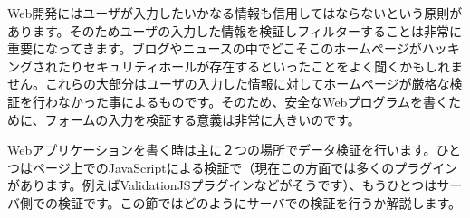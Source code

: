 Web開発にはユーザが入力したいかなる情報も信用してはならないという原則があります。そのためユーザの入力した情報を検証しフィルターすることは非常に重要になってきます。ブログやニュースの中でどこそこのホームページがハッキングされたりセキュリティホールが存在するといったことをよく聞くかもしれません。これらの大部分はユーザの入力した情報に対してホームページが厳格な検証を行わなかった事によるものです。そのため、安全なWebプログラムを書くために、フォームの入力を検証する意義は非常に大きいのです。

Webアプリケーションを書く時は主に２つの場所でデータ検証を行います。ひとつはページ上でのJavaScriptによる検証で（現在この方面では多くのプラグインがあります。例えばValidationJSプラグインなどがそうです）、もうひとつはサーバ側での検証です。この節ではどのようにサーバでの検証を行うか解説します。
